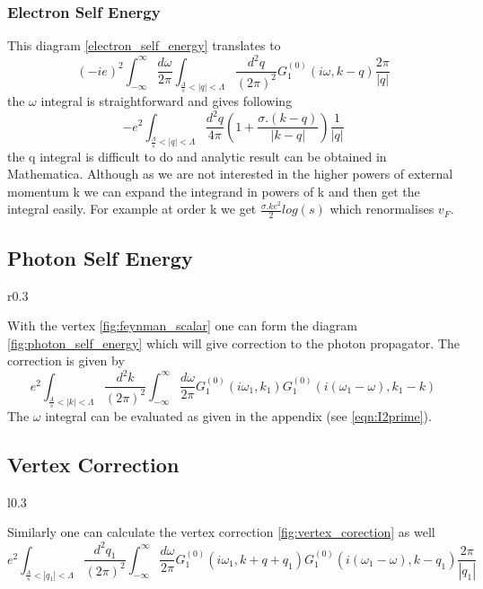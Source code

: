 \documentclass[a4paper,crop=false]{standalone}
\begin{document}
        \subsubsection*{Electron Self Energy}
            This diagram \ref{electron_self_energy} translates to 
            \begin{equation}
                (-ie)^2\int^{\infty}_{-\infty}\frac{d\omega}{2\pi}\int_{\frac{\Lambda}{s}<|q|<\Lambda}\frac{d^2q}{(2\pi)^2} G^{(0)}_1(i\omega,k - q)\frac{2\pi}{|q|}
            \end{equation}
            the $\omega$ integral is straightforward and gives following
            \begin{equation}
                -e^2\int_{\frac{\Lambda}{s}<|q|<\Lambda}\frac{d^2q}{4\pi} (1 + \frac{\sigma . (k-q)}{|k-q|})\frac{1}{|q|}
            \end{equation}
            the q integral is difficult to do and analytic result can be obtained in Mathematica. Although as we are not interested in the higher powers of external momentum k we can expand the integrand in powers of k and then get the integral easily. For example at order k we get $\frac{\sigma . k e^2}{2} log(s)$ which renormalises $v_F$.
    \subsection{Photon Self Energy}
        \begin{wrapfigure}{r}{0.3\textwidth}
            \centering
            
            \caption{Photon Self Energy}
            \label{fig:photon_self_energy}
        \end{wrapfigure}
        With the vertex \ref{fig:feynman_scalar} one can form the diagram \ref{fig:photon_self_energy} which will give correction to the photon propagator. The correction is given by
        \begin{equation}
            e^2\int_{\frac{\Lambda}{s}<|k|<\Lambda}\frac{d^2k}{(2\pi)^2}\int_{-\infty}^{\infty}\frac{d\omega}{2\pi}G_{1}^{(0)}(i\omega_1,k_1)G_{1}^{(0)}(i(\omega_1-\omega),k_1-k)
        \end{equation}
        The $\omega$ integral can be evaluated as given in the appendix (see \ref{eqn:I2prime}).

        \subsection{Vertex Correction}
        \begin{wrapfigure}{l}{0.3\textwidth}
            \centering
            
            \caption{Vertex Correction}
            \label{fig:vertex_corection}
        \end{wrapfigure}   
        Similarly one can calculate the vertex correction \ref{fig:vertex_corection} as well
        \begin{equation}
            e^2\int_{\frac{\Lambda}{s}<|q_1|<\Lambda}\frac{d^2q_1}{(2\pi)^2}\int_{-\infty}^{\infty}\frac{d\omega}{2\pi}G_{1}^{(0)}(i\omega_1,k + q + q_1)G_{1}^{(0)}(i(\omega_1-\omega),k-q_1)\frac{2\pi}{|q_1|}
        \end{equation}  
\end{document}
